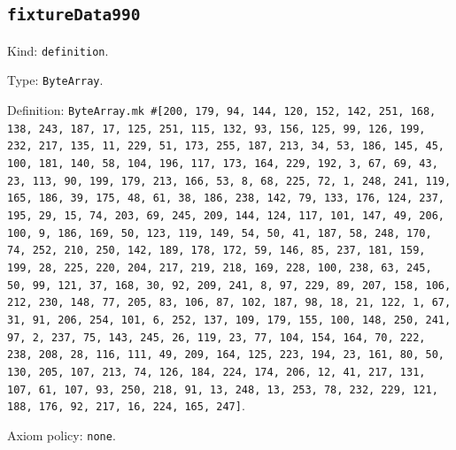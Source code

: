 \documentclass[11pt]{article}
\begin{document}
\subsection*{\texttt{fixtureData990}}
\noindent Kind: \texttt{definition}.\par
\noindent Type: \texttt{ByteArray}.\par
\noindent Definition: \texttt{ByteArray.mk \#[200, 179, 94, 144, 120, 152, 142, 251, 168, 138, 243, 187, 17, 125, 251, 115, 132, 93, 156, 125, 99, 126, 199, 232, 217, 135, 11, 229, 51, 173, 255, 187, 213, 34, 53, 186, 145, 45, 100, 181, 140, 58, 104, 196, 117, 173, 164, 229, 192, 3, 67, 69, 43, 23, 113, 90, 199, 179, 213, 166, 53, 8, 68, 225, 72, 1, 248, 241, 119, 165, 186, 39, 175, 48, 61, 38, 186, 238, 142, 79, 133, 176, 124, 237, 195, 29, 15, 74, 203, 69, 245, 209, 144, 124, 117, 101, 147, 49, 206, 100, 9, 186, 169, 50, 123, 119, 149, 54, 50, 41, 187, 58, 248, 170, 74, 252, 210, 250, 142, 189, 178, 172, 59, 146, 85, 237, 181, 159, 199, 28, 225, 220, 204, 217, 219, 218, 169, 228, 100, 238, 63, 245, 50, 99, 121, 37, 168, 30, 92, 209, 241, 8, 97, 229, 89, 207, 158, 106, 212, 230, 148, 77, 205, 83, 106, 87, 102, 187, 98, 18, 21, 122, 1, 67, 31, 91, 206, 254, 101, 6, 252, 137, 109, 179, 155, 100, 148, 250, 241, 97, 2, 237, 75, 143, 245, 26, 119, 23, 77, 104, 154, 164, 70, 222, 238, 208, 28, 116, 111, 49, 209, 164, 125, 223, 194, 23, 161, 80, 50, 130, 205, 107, 213, 74, 126, 184, 224, 174, 206, 12, 41, 217, 131, 107, 61, 107, 93, 250, 218, 91, 13, 248, 13, 253, 78, 232, 229, 121, 188, 176, 92, 217, 16, 224, 165, 247]}.\par
\noindent Axiom policy: \texttt{none}.\par
\end{document}
